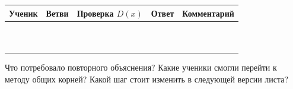 \begin{center}
  \small
  \renewcommand{\arraystretch}{1.55}
  \begin{tabularx}{\textwidth}{
    >{\raggedright\arraybackslash}p{}
    >{\centering\arraybackslash}p{}
    >{\centering\arraybackslash}p{}
    >{\centering\arraybackslash}p{}
    >{\raggedright\arraybackslash}X}
    \toprule
    \rowcolor{TableHeader}
    Ученик & Ветви & Проверка \(D(x)\) & Ответ & Комментарий \\
    \midrule
    \rule{0pt}{5mm} & & & & \\
    \midrule
    \rule{0pt}{5mm} & & & & \\
    \midrule
    \rule{0pt}{5mm} & & & & \\
    \midrule
    \rule{0pt}{5mm} & & & & \\
    \midrule
    \rule{0pt}{5mm} & & & & \\
    \midrule
    \rule{0pt}{5mm} & & & & \\
    \midrule
    \rule{0pt}{5mm} & & & & \\
    \midrule
    \rule{0pt}{5mm} & & & & \\
    \midrule
    \rule{0pt}{5mm} & & & & \\
    \midrule
    \rule{0pt}{5mm} & & & & \\
    \bottomrule
  \end{tabularx}
\end{center}

\begin{teacherbox}
  Что потребовало повторного объяснения? Какие ученики смогли перейти к
  методу общих корней? Какой шаг стоит изменить в следующей версии листа?
\end{teacherbox}
\workarea{28mm}
